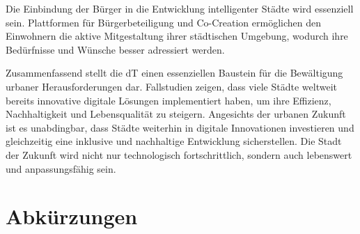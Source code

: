 \documentclass[conference,compsoc,final,a4paper, onecolumn, 11pt]{IEEEtran}
\begin{document}
Die Einbindung der Bürger in die Entwicklung intelligenter Städte wird essenziell sein. 
Plattformen für Bürgerbeteiligung und Co-Creation ermöglichen den Einwohnern die aktive Mitgestaltung ihrer städtischen Umgebung, wodurch ihre Bedürfnisse und Wünsche besser adressiert werden.

Zusammenfassend stellt die \ac{dT} einen essenziellen Baustein für die Bewältigung urbaner Herausforderungen dar. 
Fallstudien zeigen, dass viele Städte weltweit bereits innovative digitale Lösungen implementiert haben, um ihre Effizienz, Nachhaltigkeit und Lebensqualität zu steigern. 
Angesichts der urbanen Zukunft ist es unabdingbar, dass Städte weiterhin in digitale Innovationen investieren und gleichzeitig eine inklusive und nachhaltige Entwicklung sicherstellen. 
Die Stadt der Zukunft wird nicht nur technologisch fortschrittlich, sondern auch lebenswert und anpassungsfähig sein.


\section*{Abkürzungen}

\begin{acronym}[BIM]
\end{acronym}

\printbibliography
\end{document}
